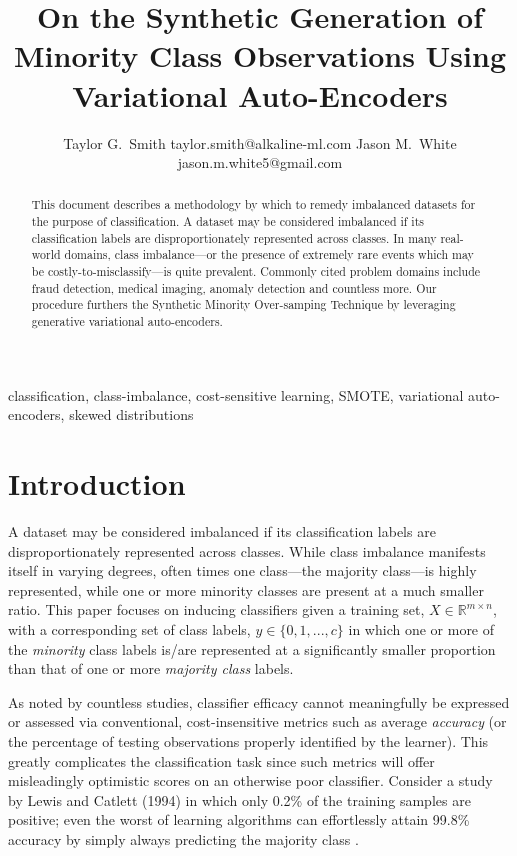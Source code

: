 \documentclass[twoside,11pt]{article}
\begin{document}
\title{On the Synthetic Generation of Minority Class Observations Using Variational Auto-Encoders}

\author{\name Taylor G.\ Smith \email taylor.smith@alkaline-ml.com
       \AND
       \name Jason M.\ White \email jason.m.white5@gmail.com}

\maketitle

\begin{abstract}%
This document describes a methodology by which to remedy imbalanced datasets for the purpose of classification. A dataset may be considered imbalanced if its classification labels are disproportionately represented across classes. In many real-world domains, class imbalance---or the presence of extremely rare events which may be costly-to-misclassify---is quite prevalent. Commonly cited problem domains include fraud detection, medical imaging, anomaly detection and countless more.  Our procedure furthers the Synthetic Minority Over-samping Technique \citep{chawla2002smote} by leveraging generative variational auto-encoders.
\end{abstract}

\begin{keywords}
  classification, class-imbalance, cost-sensitive learning, SMOTE, variational auto-encoders, skewed distributions
\end{keywords}

\section{Introduction}

A dataset may be considered imbalanced if its classification labels are disproportionately represented across classes. While class imbalance manifests itself in varying degrees, often times one class---the majority class---is highly represented, while one or more minority classes are present at a much smaller ratio. This paper focuses on inducing classifiers given a training set, $X \in \mathbb{R}^{m \times n}$, with a corresponding set of class labels, $y \in \{0, 1, ..., c\}$ in which one or more of the \emph{minority} class labels is/are represented at a significantly smaller proportion than that of one or more \emph{majority class} labels.

As noted by countless studies, classifier efficacy cannot meaningfully be expressed or assessed via conventional, cost-insensitive metrics such as average \emph{accuracy} (or the percentage of testing observations properly identified by the learner). This greatly complicates the classification task since such metrics will offer misleadingly optimistic scores on an otherwise poor classifier. Consider a study by Lewis and Catlett (1994) in which only 0.2\% of the training samples are positive; even the worst of learning algorithms can effortlessly attain 99.8\% accuracy by simply always predicting the majority class \citep{lewis1994heterogeneous}.
\end{document}

